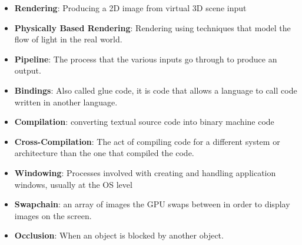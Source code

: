 \documentclass[../report.tex]{subfiles}
\begin{document}
% 
% 		
% 		

\begin{itemize}
    \item \textbf{Rendering}: Producing a 2D image from virtual 3D scene input 
    \item \textbf{Physically Based Rendering}: Rendering using techniques that model the flow of light in the real world.
    \item \textbf{Pipeline}: The process that the various inputs go through to produce an output.

    \item \textbf{Bindings}: Also called glue code, it is code that allows a language to call code written in another language.
    \item \textbf{Compilation}: converting textual source code into binary machine code
    \item \textbf{Cross-Compilation}: The act of compiling code for a different system or architecture than the one that compiled the code.
    \item \textbf{Windowing}: Processes involved with creating and handling application windows, usually at the OS level
    \item \textbf{Swapchain}: an array of images the GPU swaps between in order to display images on the screen.
    \item \textbf{Occlusion}: When an object is blocked by another object.
\end{itemize}
\end{document}

